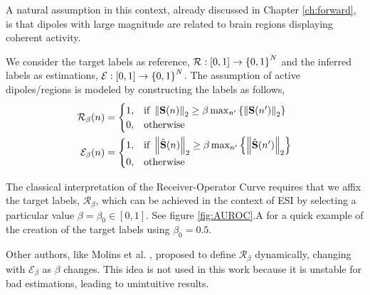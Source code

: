 %

%
A natural assumption in this context, already discussed in Chapter \ref{ch:forward}, is that dipoles with large magnitude are related to brain regions displaying coherent activity.

We consider the target labels as reference, ${\mathcal{R}: [0,1] \rightarrow \left\{ 0,1 \right\}^N}$ and the inferred labels as estimations, $\mathcal{E}: [0,1] \rightarrow \left\{ 0,1 \right\}^N$.
%
The assumption of active dipoles/regions is modeled by constructing the labels as follows,
\begin{align}
\mathcal{R}_\beta(n)
&=
\begin{cases}
1, &\text{if }
\left\lVert \mathbf{S}(n) \right\rVert_2 \geq \beta \max_{n'}\left\{ \left\lVert \mathbf{S}(n') \right\rVert_2 \right\}
\\
0, &\text{otherwise}
\end{cases}
\\
\mathcal{E}_\beta(n)
&=
\begin{cases}
1, &\text{if }
\left\lVert \hat{\mathbf{S}}(n) \right\rVert_2 \geq \beta \max_{n'}\left\{ \left\lVert \hat{\mathbf{S}}(n') \right\rVert_2 \right\}
\\
0, &\text{otherwise}
\end{cases}
\end{align}

%
The classical interpretation of the Receiver-Operator Curve requires that we affix the target labels, $\mathcal{R}_\beta$, which can be achieved in the context of ESI by selecting a particular value $\beta = \beta_0 \in [0,1]$.
%
See figure \ref{fig:AUROC}.A for a quick example of the creation of the target labels using $\beta_0=0.5$.

Other authors, like Molins et al. \cite{molins2008quantification}, proposed to define $\mathcal{R}_\beta$ dynamically, changing with $\mathcal{E}_\beta$ as $\beta$ changes.
%
This idea is not used in this work because it is unstable for bad estimations, leading to unintuitive results.


